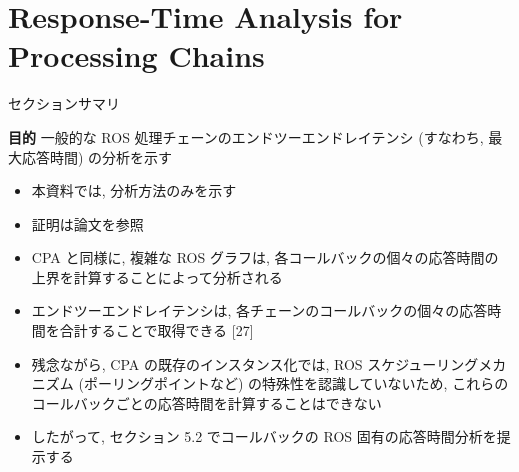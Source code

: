 
\section{Response-Time Analysis for Processing Chains}
\label{sec: response-time analysis for processing chains}

\begin{frame}{セクションサマリ}
    \begin{itembox}[l]{\textbf{目的}}
        一般的な ROS 処理チェーンのエンドツーエンドレイテンシ (すなわち, 最大応答時間) の分析を示す
    \end{itembox}
\end{frame}

\begin{frame}{}
    \begin{itemize}
        \item 本資料では, 分析方法のみを示す
        \item 証明は論文を参照
    \end{itemize}
\end{frame}

\begin{frame}{}
    \begin{itemize}
        \item CPA と同様に, 複雑な ROS グラフは, 各コールバックの個々の応答時間の上界を計算することによって分析される
        \item エンドツーエンドレイテンシは, 各チェーンのコールバックの個々の応答時間を合計することで取得できる [27]
        \item 残念ながら, CPA の既存のインスタンス化では, ROS スケジューリングメカニズム (ポーリングポイントなど) の特殊性を認識していないため, これらのコールバックごとの応答時間を計算することはできない
        \item したがって, セクション 5.2 でコールバックの ROS 固有の応答時間分析を提示する
    \end{itemize}
\end{frame}

